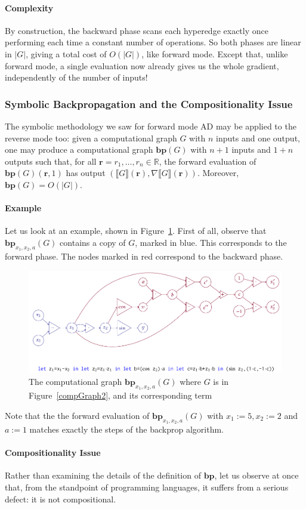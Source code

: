 \paragraph{Complexity}
By construction, the backward phase scans each hyperedge exactly once performing each time a constant number
of operations. So both phases are linear in $|G|$, giving a total cost of $O(|G|)$, like forward mode. Except that, unlike
forward mode, a single evaluation now already gives us the whole gradient, independently of the number of inputs!

\subsubsection{Symbolic Backpropagation and the Compositionality Issue}
The symbolic methodology we saw for forward mode AD may be applied to the reverse mode too: given a computational graph $G$ with $n$ inputs and one output, one may produce a computational graph $\mathbf{bp}(G)$ with $n + 1$ inputs and $1 + n$ outputs such that, for all $\mathbf{r} = r_1 , \dots , r_n \in \mathbb{R}$, the forward evaluation of $\mathbf{bp}(G)(\mathbf{r}, 1)$ has output $(\llbracket G \rrbracket(\mathbf{r} ), \nabla\llbracket G \rrbracket(\mathbf{r} ))$. Moreover, $\mathbf{bp}(G) = O(|G|)$.

\paragraph{Example} Let us look at an example, shown in Figure~\ref{compGraph2SBM}. First of all, observe that $\mathbf{bp}_{x_1, x_2, a} (G)$ contains a copy of $G$, marked in blue. This corresponds to the forward phase. The nodes marked in red correspond to the backward phase.

\begin{figure}[h!]
	\centering
	\includegraphics[scale=0.45]{img/compGraph2SBM}
	\caption{The computational graph $\mathbf{bp}_{x_1, x_2, a} (G)$ where $G$ is in Figure~\ref{compGraph2}, and its corresponding 			term}
	\label{compGraph2SBM}
\end{figure}

Note that the the forward evaluation of $\mathbf{bp}_{x_1, x_2, a} (G)$ with $x_1 := 5, x_2 := 2$ and $a := 1$ matches exactly the steps of the backprop algorithm.

\paragraph{Compositionality Issue}
Rather than examining the details of the deﬁnition of $\mathbf{bp}$, let us observe at once that, from the standpoint of programming languages, it suﬀers from a serious defect: it is not compositional.